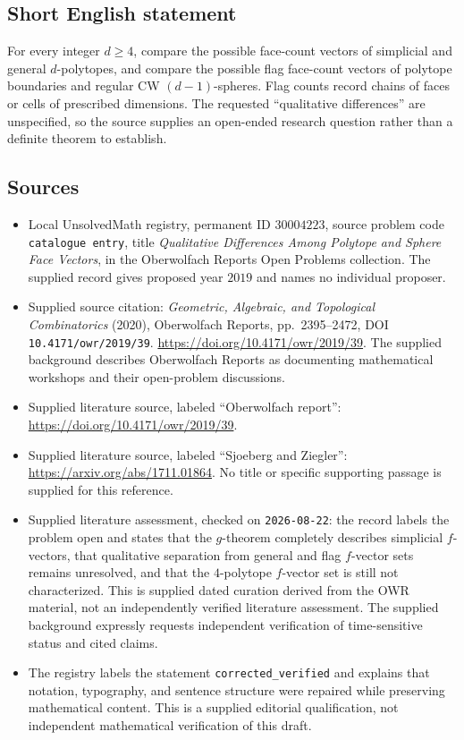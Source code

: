 \documentclass[11pt]{article}
\begin{document}
\subsection{Short English statement}
For every integer \(d\geq4\), compare the possible face-count vectors of simplicial and general \(d\)-polytopes, and compare the possible flag face-count vectors of polytope boundaries and regular CW \((d-1)\)-spheres. Flag counts record chains of faces or cells of prescribed dimensions. The requested ``qualitative differences'' are unspecified, so the source supplies an open-ended research question rather than a definite theorem to establish.
\subsection{Sources}
\begin{itemize}
\item Local UnsolvedMath registry, permanent ID \(30004223\), source problem code \texttt{catalogue entry}, title \emph{Qualitative Differences Among Polytope and Sphere Face Vectors}, in the Oberwolfach Reports Open Problems collection. The supplied record gives proposed year \(2019\) and names no individual proposer.
\item Supplied source citation: \emph{Geometric, Algebraic, and Topological Combinatorics} (2020), Oberwolfach Reports, pp.\ 2395--2472, DOI \texttt{10.4171/owr/2019/39}. \url{https://doi.org/10.4171/owr/2019/39}. The supplied background describes Oberwolfach Reports as documenting mathematical workshops and their open-problem discussions.
\item Supplied literature source, labeled ``Oberwolfach report'': \url{https://doi.org/10.4171/owr/2019/39}.
\item Supplied literature source, labeled ``Sjoeberg and Ziegler'': \url{https://arxiv.org/abs/1711.01864}. No title or specific supporting passage is supplied for this reference.
\item Supplied literature assessment, checked on \texttt{2026-08-22}: the record labels the problem open and states that the \(g\)-theorem completely describes simplicial \(f\)-vectors, that qualitative separation from general and flag \(f\)-vector sets remains unresolved, and that the \(4\)-polytope \(f\)-vector set is still not characterized. This is supplied dated curation derived from the OWR material, not an independently verified literature assessment. The supplied background expressly requests independent verification of time-sensitive status and cited claims.
\item The registry labels the statement \texttt{corrected\_verified} and explains that notation, typography, and sentence structure were repaired while preserving mathematical content. This is a supplied editorial qualification, not independent mathematical verification of this draft.
\end{itemize}
\end{document}
